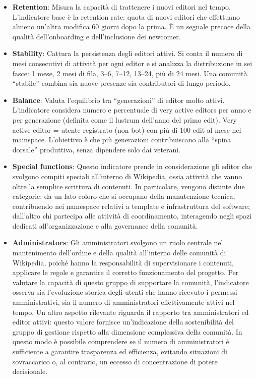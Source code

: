 \begin{itemize}
    \item \textbf{Retention}: Misura la capacità di trattenere i nuovi editori nel tempo. L’indicatore base è la retention rate: quota di nuovi editori che effettuano almeno un’altra modifica 60 giorni dopo la prima. È un segnale precoce della qualità dell’onboarding e dell’inclusione dei newcomer.
    \item \textbf{Stability}: Cattura la persistenza degli editori attivi. Si conta il numero di mesi consecutivi di attività per ogni editor e si analizza la distribuzione in sei fasce: 1 mese, 2 mesi di fila, 3–6, 7–12, 13–24, più di 24 mesi. Una comunità “stabile” combina sia nuove presenze sia contributori di lungo periodo.
    \item \textbf{Balance}: Valuta l’equilibrio tra “generazioni” di editor molto attivi. L’indicatore considera numero e percentuale di very active editors per anno e per generazione (definita come il lustrum dell’anno del primo edit). Very active editor = utente registrato (non bot) con più di 100 edit al mese nel mainspace. L’obiettivo è che più generazioni contribuiscano alla “spina dorsale” produttiva, senza dipendere solo dai veterani.
    \item \textbf{Special functions}: Questo indicatore prende in considerazione gli editor che svolgono compiti speciali all’interno di Wikipedia, ossia attività che vanno oltre la semplice scrittura di contenuti. In particolare, vengono distinte due categorie: da un lato coloro che si occupano della manutenzione tecnica, contribuendo nei namespace relativi a template e infrastruttura del software; dall’altro chi partecipa alle attività di coordinamento, interagendo negli spazi dedicati all’organizzazione e alla governance della comunità.
    \item \textbf{Administrators}: Gli amministratori svolgono un ruolo centrale nel mantenimento dell’ordine e della qualità all’interno delle comunità di Wikipedia, poiché hanno la responsabilità di supervisionare i contenuti, applicare le regole e garantire il corretto funzionamento del progetto. Per valutare la capacità di questo gruppo di supportare la comunità, l’indicatore osserva sia l’evoluzione storica degli utenti che hanno ricevuto i permessi amministrativi, sia il numero di amministratori effettivamente attivi nel tempo. Un altro aspetto rilevante riguarda il rapporto tra amministratori ed editor attivi: questo valore fornisce un’indicazione della sostenibilità del gruppo di gestione rispetto alla dimensione complessiva della comunità. In questo modo è possibile comprendere se il numero di amministratori è sufficiente a garantire trasparenza ed efficienza, evitando situazioni di sovraccarico o, al contrario, un eccesso di concentrazione di potere decisionale.

\end{itemize}
